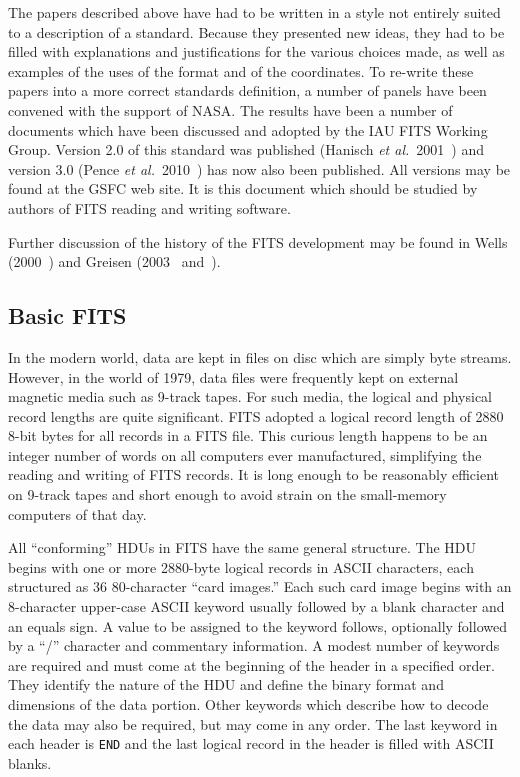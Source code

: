 \documentclass[twoside]{article}
\newcommand{\etal}{{\it et al.}}
\newcommand{\keyw}[1]{\hbox{{\tt #1}}}
\begin{document}
The papers described above have had to be written in a style not
entirely suited to a description of a standard.  Because they
presented new ideas, they had to be filled with explanations and
justifications for the various choices made, as well as examples of
the uses of the format and of the coordinates.  To re-write these
papers into a more correct standards definition, a number of panels
have been convened with the support of NASA\@.  The results have been
a number of documents which have been discussed and adopted by the IAU
FITS Working Group.  Version 2.0 of this standard was published
(Hanisch \etal~2001~\cite{HFGPSTTW01}) and version 3.0 (Pence
\etal~2010~\cite{PCPSS10}) has now also been published.  All versions
may be found at the GSFC web site.  It is this document which should
be studied by authors of FITS reading and writing software.

Further discussion of the history of the FITS development may be found
in Wells (2000~\cite{W00}) and Greisen (2003~\cite{G03}
and~\cite{G03b}).
\vfill\eject

\subsection{Basic FITS}

In the modern world, data are kept in files on disc which are simply
byte streams.  However, in the world of 1979, data files were
frequently kept on external magnetic media such as 9-track tapes.  For
such media, the logical and physical record lengths are quite
significant.  FITS adopted a logical record length of 2880 8-bit bytes
for all records in a FITS file.  This curious length happens to be an
integer number of words on all computers ever manufactured,
simplifying the reading and writing of FITS records.  It is long
enough to be reasonably efficient on 9-track tapes and short enough to
avoid strain on the small-memory computers of that day.

All ``conforming'' HDUs in FITS have the same general structure.  The
HDU begins with one or more 2880-byte logical records in ASCII
characters, each structured as 36 80-character ``card images.''  Each
such card image begins with an 8-character upper-case ASCII keyword
usually followed by a blank character and an equals sign.  A value to
be assigned to the keyword follows, optionally followed by a ``/''
character and commentary information.  A modest number of keywords are
required and must come at the beginning of the header in a specified
order.  They identify the nature of the HDU and define the binary
format and dimensions of the data portion.  Other keywords which
describe how to decode the data may also be required, but may come in
any order.  The last keyword in each header is \keyw{END} and the last
logical record in the header is filled with ASCII blanks.
\end{document}

